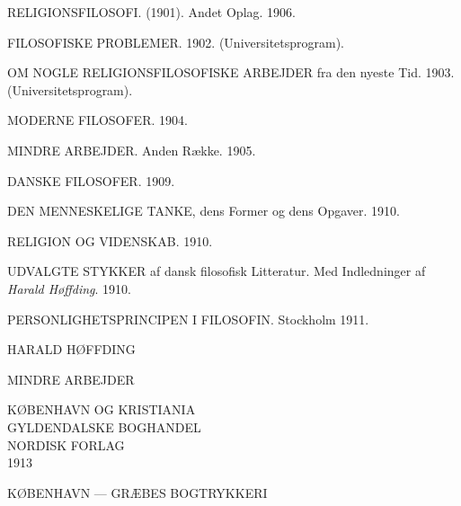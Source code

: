 \documentclass[12pt,a4paper,openany]{book}
\begin{document}
\begin{small}
RELIGIONSFILOSOFI. (1901). Andet Oplag. 1906.\par
FILOSOFISKE PROBLEMER. 1902. (Universitetsprogram).\par
OM NOGLE RELIGIONSFILOSOFISKE ARBEJDER fra den nyeste Tid. 1903. (Universitetsprogram).\par
MODERNE FILOSOFER. 1904.\par
MINDRE ARBEJDER. Anden Række. 1905.\par
DANSKE FILOSOFER. 1909.\par
DEN MENNESKELIGE TANKE, dens Former og dens Opgaver. 1910.\par
RELIGION OG VIDENSKAB. 1910.\par
UDVALGTE STYKKER af dansk filosofisk Litteratur. Med Indledninger af \textit{Harald Høffding}. 1910.\par
PERSONLIGHETSPRINCIPEN I FILOSOFIN. Stockholm 1911.\par
\end{small}
\clearpage
\begin{titlepage}\centering\vspace*{2cm}
{\large HARALD HØFFDING}\par\vspace{2cm}
{\Huge MINDRE ARBEJDER}\par\vspace{1ex}{\large TREDIE RÆKKE}\par\vfill
{\small KØBENHAVN OG KRISTIANIA}\\[0.5ex]{\small GYLDENDALSKE BOGHANDEL}\\[0.5ex]{\small NORDISK FORLAG}\\[1ex]1913
\end{titlepage}
\thispagestyle{empty}\vspace*{\fill}\begin{center}{\small KØBENHAVN --- GRÆBES BOGTRYKKERI}\end{center}\clearpage
\end{document}
